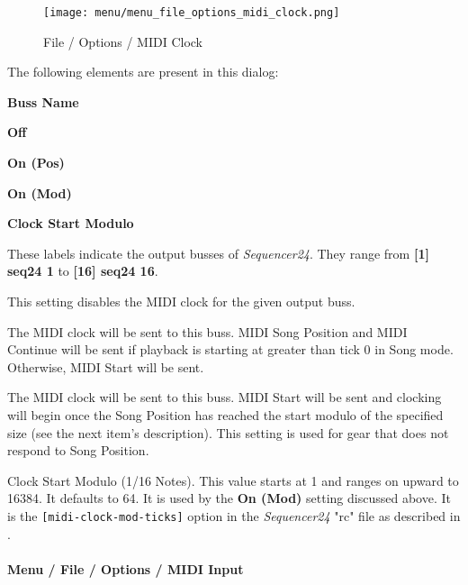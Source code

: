 \begin{figure}[H]
   \centering 
   \texttt{[image: menu/menu\_file\_options\_midi\_clock.png]}
   \caption{File / Options / MIDI Clock}
   \label{fig:seq24_menu_file_options_midi_clock}
\end{figure}

   The following elements are present in this dialog:

   \begin{enumber}
      \item \textbf{Buss Name}
      \item \textbf{Off}
      \item \textbf{On (Pos)}
      \item \textbf{On (Mod)}
      \item \textbf{Clock Start Modulo}
   \end{enumber}

   \setcounter{ItemCounter}{0}      %

   These labels indicate the output busses of \textsl{Sequencer24}.
   They range from \textbf{[1] seq24 1}
   to \textbf{[16] seq24 16}.

   This setting disables the MIDI clock for the given output buss.

   The MIDI clock will be sent to this buss.
   MIDI Song Position and MIDI Continue will be sent if playback is starting
   at greater than tick 0 in Song mode.  Otherwise, MIDI Start will be sent.

   The MIDI clock will be sent to this buss.
   MIDI Start will be sent and clocking will begin
   once the Song Position has reached the start modulo of the specified size
   (see the next item's description).
   This setting is used for gear that does not respond to Song Position.

   Clock Start Modulo (1/16 Notes).
   This value starts at 1 and ranges on upward to 16384.
   It  defaults to 64.
   It is used by the \textbf{On (Mod)} setting discussed above.
   It is the \texttt{[midi-clock-mod-ticks]} option in the \textsl{Sequencer24}
   "rc" file as described in
   .

\paragraph{Menu / File / Options / MIDI Input}
\label{paragraph:seq24_menu_file_options_midi_input}

